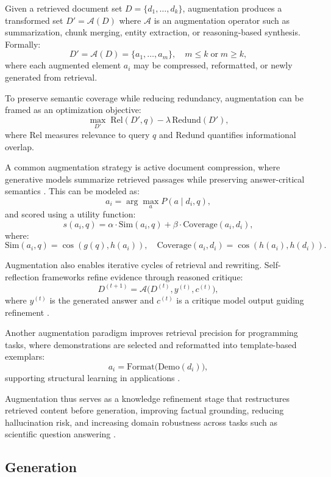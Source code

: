 Given a retrieved document set $D = \{d_1, \dots, d_k\}$, augmentation produces a transformed set $D' = \mathcal{A}(D)$ where $\mathcal{A}$ is an augmentation operator such as summarization, chunk merging, entity extraction, or reasoning-based synthesis. Formally:
\[
D' = \mathcal{A}(D) = \{ a_1, \dots, a_m \}, \quad m \leq k \; \text{or} \; m \geq k,
\]
where each augmented element $a_i$ may be compressed, reformatted, or newly generated from retrieval.

To preserve semantic coverage while reducing redundancy, augmentation can be framed as an optimization objective:
\[
\max_{D'} \; \text{Rel}(D', q) - \lambda \, \text{Redund}(D'),
\]
where $\text{Rel}$ measures relevance to query $q$ and $\text{Redund}$ quantifies informational overlap.

A common augmentation strategy is active document compression, where generative models summarize retrieved passages while preserving answer-critical semantics \cite{yoon2024compact}. This can be modeled as:
\[
a_i = \arg\max_{a} P(a \mid d_i, q),
\]
and scored using a utility function:
\[
s(a_i, q) = \alpha \cdot \text{Sim}(a_i, q) + \beta \cdot \text{Coverage}(a_i, d_i),
\]
where:
\[
\text{Sim}(a_i, q) = \cos(g(q), h(a_i)), \quad 
\text{Coverage}(a_i, d_i) = \cos(h(a_i), h(d_i)).
\]

Augmentation also enables iterative cycles of retrieval and rewriting. Self-reflection frameworks refine evidence through reasoned critique:
\[
D^{(t+1)} = \mathcal{A}\big(D^{(t)}, y^{(t)}, c^{(t)}\big),
\]
where $y^{(t)}$ is the generated answer and $c^{(t)}$ is a critique model output guiding refinement \cite{asai2023selfrag}.

Another augmentation paradigm improves retrieval precision for programming tasks, where demonstrations are selected and reformatted into template-based exemplars:
\[
a_i = \text{Format}\big(\text{Demo}(d_i)\big),
\]
supporting structural learning in applications \cite{he2024retrieval_coding}.

Augmentation thus serves as a knowledge refinement stage that restructures retrieved content before generation, improving factual grounding, reducing hallucination risk, and increasing domain robustness across tasks such as scientific question answering \cite{gao2023rag_survey}.


\subsection{Generation}

